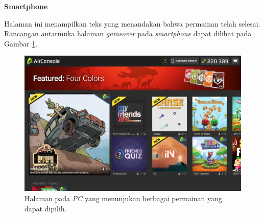 \begin{enumerate}
	\textbf{Smartphone}
	
	Halaman ini menampilkan teks yang menandakan bahwa permainan telah selesai. Rancangan antarmuka halaman \textit{gameover} pada \textit{smartphone} dapat dilihat pada Gambar \ref{fig:30_con3_play1}.
	
\begin{figure}[H]
	\centering
	\includegraphics[scale=0.3]{Gambar/con3_play1}
	\caption{Halaman pada \textit{PC} yang menunjukan berbagai permainan yang dapat dipilih.}
	\label{fig:30_con3_play1}
\end{figure}
	
\end{enumerate}